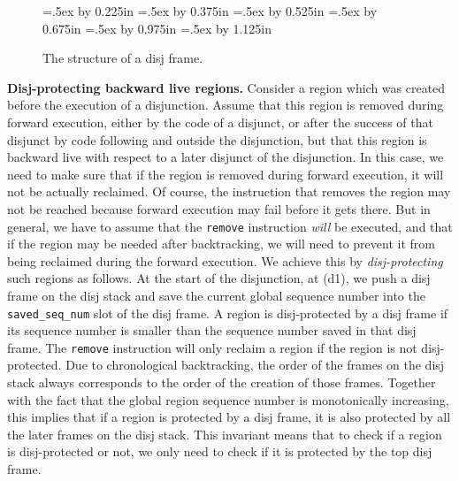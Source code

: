 \documentclass{tlp}
\newcommand{\code}[1]{{\tt#1}}
\begin{document}
\begin{figure}[htp]
\begin{center}
{{    \graphtemp=.5ex
    \advance\graphtemp by 0.225in
    \graphtemp=.5ex
    \advance\graphtemp by 0.375in
    \graphtemp=.5ex
    \advance\graphtemp by 0.525in
    \graphtemp=.5ex
    \advance\graphtemp by 0.675in
    \graphtemp=.5ex
    \advance\graphtemp by 0.975in
    \graphtemp=.5ex
    \advance\graphtemp by 1.125in
    \hbox{\vrule depth1.350in width0pt height 0pt}\kern 4.500in
  }}\centerline{\box\graph}
\end{center}
\caption{The structure of a disj frame.}
\label{fig:disjframe}
\end{figure}

\noindent\textbf{Disj-protecting backward live regions.}
Consider a region which was created before the execution of a disjunction.
Assume that this region is removed during forward execution,
either by the code of a disjunct,
or after the success of that disjunct
by code following and outside the disjunction,
but that this region is backward live with respect to
a later disjunct of the disjunction.
In this case, we need to make sure that
if the region is removed during forward execution,
it will not be actually reclaimed.
Of course, the instruction that removes the region may not be reached
because forward execution may fail before it gets there.
But in general, we have to assume that
the \code{remove} instruction \emph{will} be executed,
and that if the region may be needed after backtracking,
we will need to prevent it from being reclaimed
during the forward execution.
We achieve this by \emph{disj-protecting} such regions as follows.
At the start of the disjunction, at (d1),
we push a disj frame on the disj stack
and save the current global sequence number into
the \code{saved\_seq\_num} slot of the disj frame.
A region is disj-protected by a disj frame if its sequence number
is smaller than the sequence number saved in that disj frame.
The \code{remove} instruction will only reclaim a region
if the region is not disj-protected.
Due to chronological backtracking,
the order of the frames on the disj stack
always corresponds to the order of the creation of those frames.
Together with the fact that
the global region sequence number is monotonically increasing,
this implies that if a region is protected by a disj frame,
it is also protected by all the later frames on the disj stack.
This invariant means that to check if a region is disj-protected or not,
we only need to check if it is protected by the top disj frame.
\end{document}
